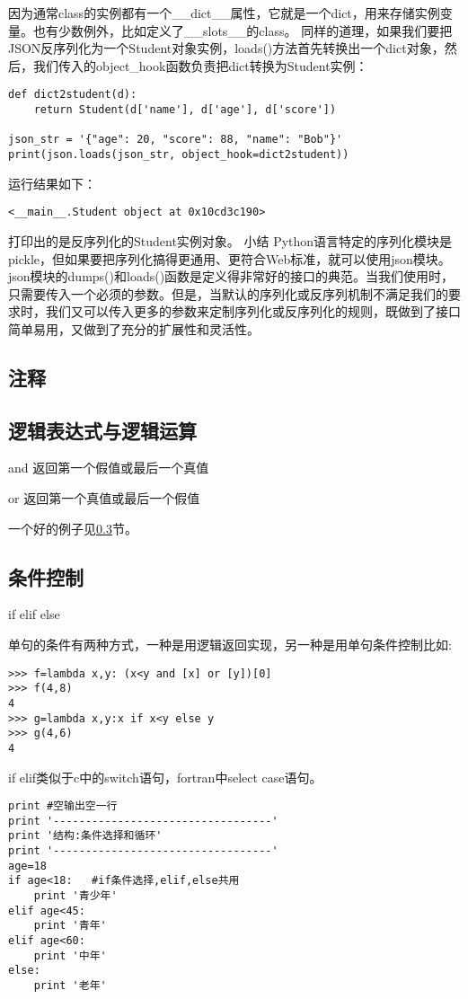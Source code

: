 \documentclass[twoside,11pt]{book}
\begin{document}
因为通常class的实例都有一个\_\_dict\_\_属性，它就是一个dict，用来存储实例变量。也有少数例外，比如定义了\_\_slots\_\_的class。
同样的道理，如果我们要把JSON反序列化为一个Student对象实例，loads()方法首先转换出一个dict对象，然后，我们传入的object\_hook函数负责把dict转换为Student实例：
\begin{lstlisting}
def dict2student(d):
    return Student(d['name'], d['age'], d['score'])

json_str = '{"age": 20, "score": 88, "name": "Bob"}'
print(json.loads(json_str, object_hook=dict2student))
\end{lstlisting}

运行结果如下：
\begin{lstlisting}
<__main__.Student object at 0x10cd3c190>
\end{lstlisting}

打印出的是反序列化的Student实例对象。
小结
Python语言特定的序列化模块是pickle，但如果要把序列化搞得更通用、更符合Web标准，就可以使用json模块。
json模块的dumps()和loads()函数是定义得非常好的接口的典范。当我们使用时，只需要传入一个必须的参数。但是，当默认的序列化或反序列机制不满足我们的要求时，我们又可以传入更多的参数来定制序列化或反序列化的规则，既做到了接口简单易用，又做到了充分的扩展性和灵活性。


\subsection{注释}

\subsection{逻辑表达式与逻辑运算}

and 返回第一个假值或最后一个真值

or 返回第一个真值或最后一个假值

一个好的例子见\ref{sec:ctrl:condition}节。


\subsection{条件控制}\label{sec:ctrl:condition}
if elif else

单句的条件有两种方式，一种是用逻辑返回实现，另一种是用单句条件控制比如:
\begin{lstlisting}
>>> f=lambda x,y: (x<y and [x] or [y])[0]
>>> f(4,8)
4
>>> g=lambda x,y:x if x<y else y
>>> g(4,6)
4
\end{lstlisting}

if elif类似于c中的switch语句，fortran中select case语句。
\begin{lstlisting}
print #空输出空一行
print '----------------------------------'
print '结构:条件选择和循环'
print '----------------------------------'
age=18
if age<18:   #if条件选择,elif,else共用
    print '青少年'
elif age<45:
    print '青年'
elif age<60:
    print '中年'
else:
    print '老年'
\end{lstlisting}
\end{document}
